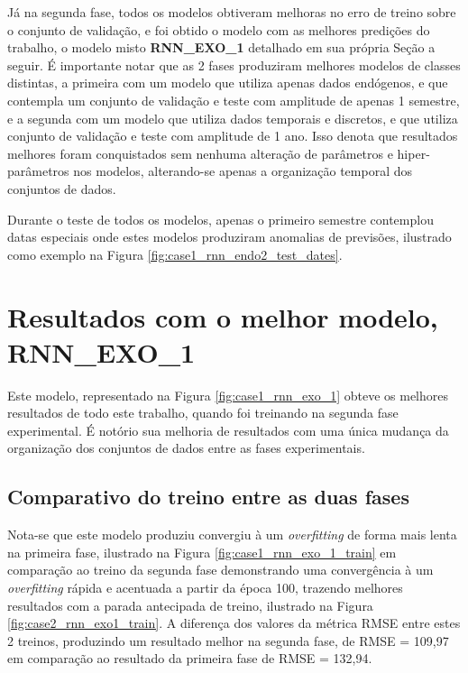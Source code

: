         Já na segunda fase, todos os modelos obtiveram melhoras no erro de treino sobre o conjunto de validação, e foi obtido o modelo com as melhores predições do trabalho, o modelo misto \textbf{RNN\_EXO\_1} detalhado em sua própria Seção a seguir.
        É importante notar que as 2 fases produziram melhores modelos de classes distintas, a primeira com um modelo que utiliza apenas dados endógenos, e que contempla um conjunto de validação e teste com amplitude de apenas 1 semestre, e a segunda com um modelo que utiliza dados temporais e discretos, e que utiliza conjunto de validação e teste com amplitude de 1 ano.
        Isso denota que resultados melhores foram conquistados sem nenhuma alteração de parâmetros e hiper-parâmetros nos modelos, alterando-se apenas a organização temporal dos conjuntos de dados.
        
        Durante o teste de todos os modelos, apenas o primeiro semestre contemplou datas especiais onde estes modelos produziram anomalias de previsões, ilustrado como exemplo na Figura \ref{fig:case1_rnn_endo2_test_dates}.

\section{Resultados com o melhor modelo, RNN\_EXO\_1}
    Este modelo, representado na Figura \ref{fig:case1_rnn_exo_1} obteve os melhores resultados de todo este trabalho, quando foi treinando na segunda fase experimental.
    É notório sua melhoria de resultados com uma única mudança da organização dos conjuntos de dados entre as fases experimentais.
    
    \subsection{Comparativo do treino entre as duas fases}
   
     Nota-se que este modelo produziu convergiu à um \textit{overfitting} de forma mais lenta na primeira fase, ilustrado na Figura \ref{fig:case1_rnn_exo_1_train} em comparação ao treino da segunda fase demonstrando uma convergência à um \textit{overfitting} rápida e acentuada a partir da época 100, trazendo melhores resultados com a parada antecipada de treino, ilustrado na Figura \ref{fig:case2_rnn_exo1_train}. A diferença dos valores da métrica RMSE entre estes 2 treinos, produzindo um resultado melhor na segunda fase, de RMSE = 109,97 em comparação ao resultado da primeira fase de RMSE = 132,94.
     

